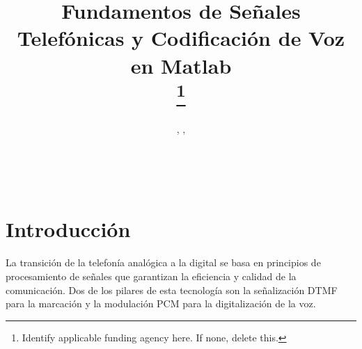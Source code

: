\documentclass[journal]{IEEEtran} %
\begin{document}
\title{Fundamentos de Señales Telefónicas y Codificación de Voz en Matlab \\
\thanks{Identify applicable funding agency here. If none, delete this.}
}

\author{%
    , %
    , %
    \\%
    \\%
    \\%
    \\%
}

\maketitle



\section{Introducción}
La transición de la telefonía analógica a la digital se basa en principios de procesamiento de señales que garantizan la eficiencia y calidad de la comunicación. Dos de los pilares de esta tecnología son la señalización DTMF para la marcación y la modulación PCM para la digitalización de la voz.
\end{document}
